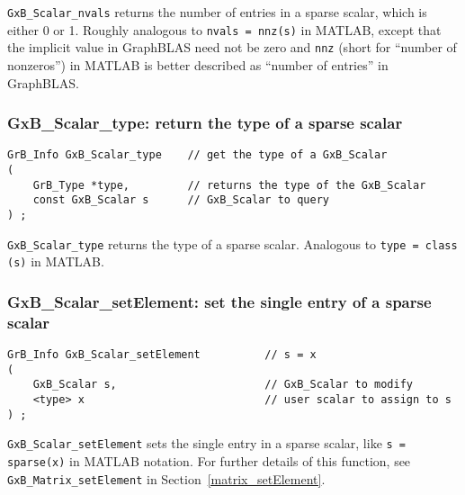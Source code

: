 \documentclass[12pt]{article}
\begin{document}
\verb'GxB_Scalar_nvals' returns the number of entries in a sparse scalar, which
is either 0 or 1.  Roughly analogous to \verb'nvals = nnz(s)' in MATLAB, except
that the implicit value in GraphBLAS need not be zero and \verb'nnz' (short for
``number of nonzeros'') in MATLAB is better described as ``number of entries''
in GraphBLAS.

\subsubsection{{\sf GxB\_Scalar\_type:} return the type of a sparse scalar}
\label{scalar_type}

\begin{mdframed}[userdefinedwidth=6in]
{\footnotesize
\begin{verbatim}
GrB_Info GxB_Scalar_type    // get the type of a GxB_Scalar
(
    GrB_Type *type,         // returns the type of the GxB_Scalar
    const GxB_Scalar s      // GxB_Scalar to query
) ;
\end{verbatim}
} \end{mdframed}

\verb'GxB_Scalar_type' returns the type of a sparse scalar.  Analogous to
\verb'type = class (s)' in MATLAB.

\subsubsection{{\sf GxB\_Scalar\_setElement:} set the single entry of a sparse scalar}
\label{scalar_setElement}

\begin{mdframed}[userdefinedwidth=6in]
{\footnotesize
\begin{verbatim}
GrB_Info GxB_Scalar_setElement          // s = x
(
    GxB_Scalar s,                       // GxB_Scalar to modify
    <type> x                            // user scalar to assign to s
) ;
\end{verbatim} } \end{mdframed}

\verb'GxB_Scalar_setElement' sets the single entry in a sparse scalar, like
\verb's = sparse(x)' in MATLAB notation.  For further details of this function,
see \verb'GxB_Matrix_setElement' in Section~\ref{matrix_setElement}.
\end{document}
